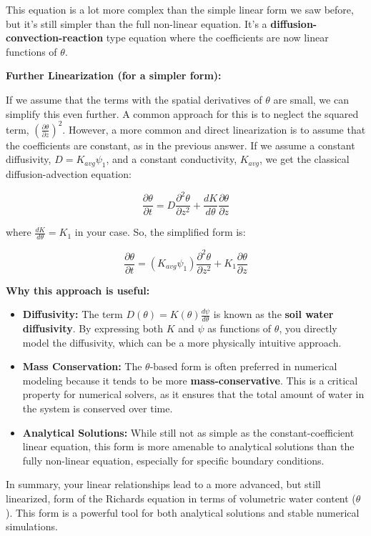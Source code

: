 \documentclass[
]{article}
\begin{document}
This equation is a lot more complex than the simple linear form we saw
before, but it's still simpler than the full non-linear equation. It's a
\textbf{diffusion-convection-reaction} type equation where the
coefficients are now linear functions of \(\theta\).

\textbf{Further Linearization (for a simpler form):}

If we assume that the terms with the spatial derivatives of \(\theta\)
are small, we can simplify this even further. A common approach for this
is to neglect the squared term,
\(\left( \frac{\partial \theta}{\partial z} \right)^2\). However, a more
common and direct linearization is to assume that the coefficients are
constant, as in the previous answer. If we assume a constant
diffusivity, \(D = K_{avg} \psi_1\), and a constant conductivity,
\(K_{avg}\), we get the classical diffusion-advection equation:

\[\frac{\partial \theta}{\partial t} = D \frac{\partial^2 \theta}{\partial z^2} + \frac{dK}{d\theta} \frac{\partial \theta}{\partial z}\]

where \(\frac{dK}{d\theta} = K_1\) in your case. So, the simplified form
is:

\[\frac{\partial \theta}{\partial t} = (K_{avg} \psi_1) \frac{\partial^2 \theta}{\partial z^2} + K_1 \frac{\partial \theta}{\partial z}\]

\textbf{Why this approach is useful:}

\begin{itemize}
\item
  \textbf{Diffusivity:} The term
  \(D(\theta) = K(\theta) \frac{d\psi}{d\theta}\) is known as the
  \textbf{soil water diffusivity}. By expressing both \(K\) and \(\psi\)
  as functions of \(\theta\), you directly model the diffusivity, which
  can be a more physically intuitive approach.
\item
  \textbf{Mass Conservation:} The \(\theta\)-based form is often
  preferred in numerical modeling because it tends to be more
  \textbf{mass-conservative}. This is a critical property for numerical
  solvers, as it ensures that the total amount of water in the system is
  conserved over time.
\item
  \textbf{Analytical Solutions:} While still not as simple as the
  constant-coefficient linear equation, this form is more amenable to
  analytical solutions than the fully non-linear equation, especially
  for specific boundary conditions.
\end{itemize}

In summary, your linear relationships lead to a more advanced, but still
linearized, form of the Richards equation in terms of volumetric water
content (\(\theta\)). This form is a powerful tool for both analytical
solutions and stable numerical simulations.
\end{document}
